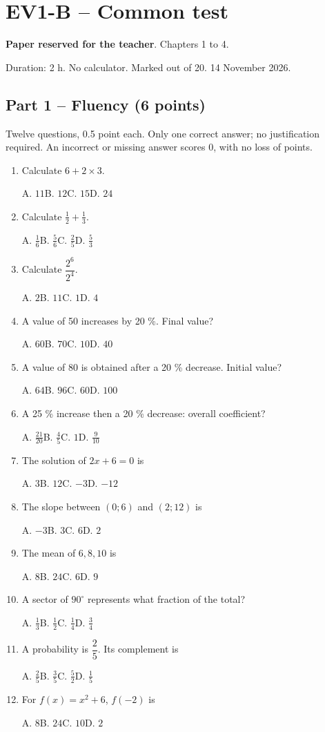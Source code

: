 \clearpage\section*{EV1-B -- Common test}\label{EV1-B}
\textbf{Paper reserved for the teacher}. Chapters 1 to 4.\par Duration: 2 h. No calculator. Marked out of 20. 14 November 2026.
\subsection*{Part 1 -- Fluency (6 points)}
Twelve questions, 0.5 point each. Only one correct answer; no justification required. An incorrect or missing answer scores 0, with no loss of points.
\begin{enumerate}
\item Calculate $6+2\times3$.\par A. $11$\quad B. $12$\quad C. $15$\quad D. $24$
\item Calculate $\frac12+\frac13$.\par A. $\frac{1}{6}$\quad B. $\frac{5}{6}$\quad C. $\frac{2}{5}$\quad D. $\frac{5}{3}$
\item Calculate $\dfrac{2^6}{2^{4}}$.\par A. $2$\quad B. $11$\quad C. $1$\quad D. $4$
\item A value of 50 increases by 20 \%. Final value?\par A. $60$\quad B. $70$\quad C. $10$\quad D. $40$
\item A value of 80 is obtained after a 20 \% decrease. Initial value?\par A. $64$\quad B. $96$\quad C. $60$\quad D. $100$
\item A 25 \% increase then a 20 \% decrease: overall coefficient?\par A. $\frac{21}{20}$\quad B. $\frac{4}{5}$\quad C. $1$\quad D. $\frac{9}{10}$
\item The solution of $2x+6=0$ is\par A. $3$\quad B. $12$\quad C. $-3$\quad D. $-12$
\item The slope between $(0;6)$ and $(2;12)$ is\par A. $-3$\quad B. $3$\quad C. $6$\quad D. $2$
\item The mean of $6, 8, 10$ is\par A. $8$\quad B. $24$\quad C. $6$\quad D. $9$
\item A sector of $90^\circ$ represents what fraction of the total?\par A. $\frac{1}{3}$\quad B. $\frac{1}{2}$\quad C. $\frac{1}{4}$\quad D. $\frac{3}{4}$
\item A probability is $\dfrac{2}{5}$. Its complement is\par A. $\frac{2}{5}$\quad B. $\frac{3}{5}$\quad C. $\frac{5}{2}$\quad D. $\frac{1}{5}$
\item For $f(x)=x^2+6$, $f(-2)$ is\par A. $8$\quad B. $24$\quad C. $10$\quad D. $2$
\end{enumerate}
